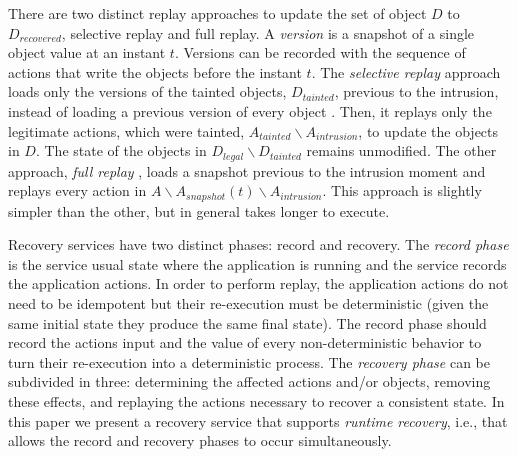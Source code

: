 There are two distinct replay approaches to update the set of object $D$ to $D_{recovered}$, 
selective replay and full replay. 
A \textit{version} is a snapshot of a single object value at an instant $t$. Versions can be recorded with the sequence of actions that write the objects before the instant $t$.
The \textit{selective replay} approach loads only the versions of the tainted objects, $D_{tainted}$, previous to the intrusion, instead of loading a previous version of every object \cite{taser,warp,Akkus2010}. Then, it replays only the legitimate actions, which were tainted, $A_{tainted} \backslash A_{intrusion}$, to update the objects in $D$. The state of the objects in $D_{legal} \backslash D_{tainted}$ remains unmodified. 
The other approach, \textit{full replay} \cite{undoForOperators}, loads a snapshot previous to the intrusion moment and replays every action in $A \backslash A_{snapshot}(t) \backslash A_{intrusion}$. This approach is slightly simpler than the other, but in general takes longer to execute. 



Recovery services have two distinct phases: record and recovery. The \emph{record phase} is the service usual state where the application is running and the service records the application actions. In order to perform replay, the application actions do not need to be idempotent but their re-execution must be deterministic (given the same initial state they produce the same final state). The record phase should record the actions input and the value of every non-deterministic behavior to turn their re-execution into a deterministic process. The \emph{recovery phase} can be subdivided in three: determining the affected actions and/or objects, removing these effects, and replaying the actions necessary to recover a consistent state. In this paper we present a recovery service that supports \textit{runtime recovery}, i.e., that allows the record and recovery phases to occur simultaneously.

